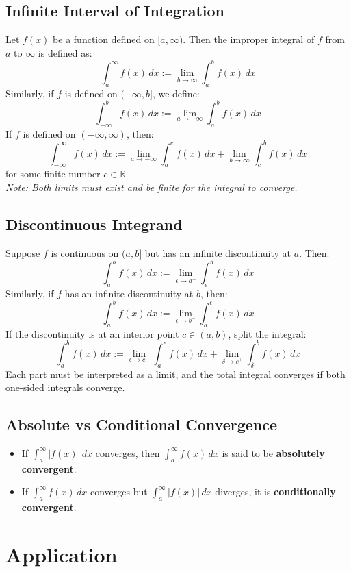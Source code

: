 \documentclass[11pt]{article}
\begin{document}
\subsection{Infinite Interval of Integration}
Let $f(x)$ be a function defined on $[a, \infty)$. Then the improper integral of $f$ from $a$ to $\infty$ is defined as:
\[
    \int_a^{\infty} f(x)\,dx := \lim_{b \to \infty} \int_a^b f(x)\,dx
\]
Similarly, if $f$ is defined on $(-\infty, b]$, we define:
\[
    \int_{-\infty}^{b} f(x)\,dx := \lim_{a \to -\infty} \int_a^b f(x)\,dx
\]
If $f$ is defined on $(-\infty, \infty)$, then:
\[
    \int_{-\infty}^{\infty} f(x)\,dx := \lim_{a \to -\infty} \int_a^c f(x)\,dx + \lim_{b \to \infty} \int_c^b f(x)\,dx
\]
for some finite number $c \in \mathbb{R}$.\\[.5em]
\textit{Note: Both limits must exist and be finite for the integral to converge.}
\subsection{Discontinuous Integrand}
Suppose $f$ is continuous on $(a, b]$ but has an infinite discontinuity at $a$. Then:
\[
    \int_a^b f(x)\,dx := \lim_{\epsilon \to a^+} \int_{\epsilon}^b f(x)\,dx
\]
Similarly, if $f$ has an infinite discontinuity at $b$, then:
\[
    \int_a^b f(x)\,dx := \lim_{\epsilon \to b^-} \int_a^{\epsilon} f(x)\,dx
\]
If the discontinuity is at an interior point $c \in (a,b)$, split the integral:
\[
    \int_a^b f(x)\,dx := \lim_{\epsilon \to c^-} \int_a^{\epsilon} f(x)\,dx + \lim_{\delta \to c^+} \int_{\delta}^b f(x)\,dx
\]
Each part must be interpreted as a limit, and the total integral converges if both one-sided integrals converge.
\subsection{Absolute vs Conditional Convergence}
\begin{itemize}
    \item If $\displaystyle\int_a^{\infty} |f(x)|\,dx$ converges, then $\displaystyle\int_a^{\infty} f(x)\,dx$ is said to be \textbf{absolutely convergent}.
    \item If $\displaystyle\int_a^{\infty} f(x)\,dx$ converges but $\displaystyle\int_a^{\infty} |f(x)|\,dx$ diverges, it is \textbf{conditionally convergent}.
\end{itemize}
\section{Application}
\end{document}
